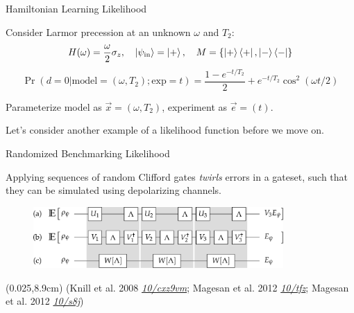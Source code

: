 \documentclass[xcolor=dvipsnames, compress]{beamer}
\renewcommand\UrlFont{\color{red}\rmfamily\itshape}
\newcommand{\shortdoi}[1]{\href{http://doi.org/#1}{\UrlFont 10/#1}}
\newcommand{\bottomnote}[1]{
  \begin{textblock*}{0.95\paperwidth} (0.025\paperwidth,8.9cm)
    {\tiny \hfill #1}
  \end{textblock*}
}
\begin{document}
\begin{frame}{Hamiltonian Learning Likelihood}
  
    Consider Larmor precession at an unknown $\omega$ and $T_2$:
    \begin{equation*}
      H(\omega) = \frac{\omega}{2} \sigma_z,\quad\ket{\psi_\text{in}} = \ket{+},\quad M = \{\ket{+}\bra{+}, \ket{-}\bra{-}\}
    \end{equation*}
    \begin{equation*}
          \Pr(d = 0 | \text{model} = (\omega, T_2); \text{exp} = t) =  \frac{1 - e^{-t / T_2}}{2} + e^{-t / T_2} \cos^2(\omega t / 2)
    \end{equation*}

    \pause

    Parameterize model as $\vec{x} = (\omega, T_2)$, experiment as $\vec{e} = (t)$.

\end{frame}


\begin{frame}

  Let's consider another example of a likelihood function
  before we move on.

\end{frame}

\begin{frame}{Randomized Benchmarking Likelihood}

  Applying sequences of random Clifford gates \emph{twirls}
  errors in a gateset, such that they can be simulated
  using depolarizing channels.

  \begin{figure}
    \centering
    \includegraphics[width=0.85\textwidth]{figures/rb-0order-deriv}
  \end{figure}

  \bottomnote{(Knill et al. 2008 \shortdoi{cxz9vm}; Magesan et al. 2012 \shortdoi{tfz}; Magesan et al. 2012 \shortdoi{s8j})}

\end{frame}
\end{document}
